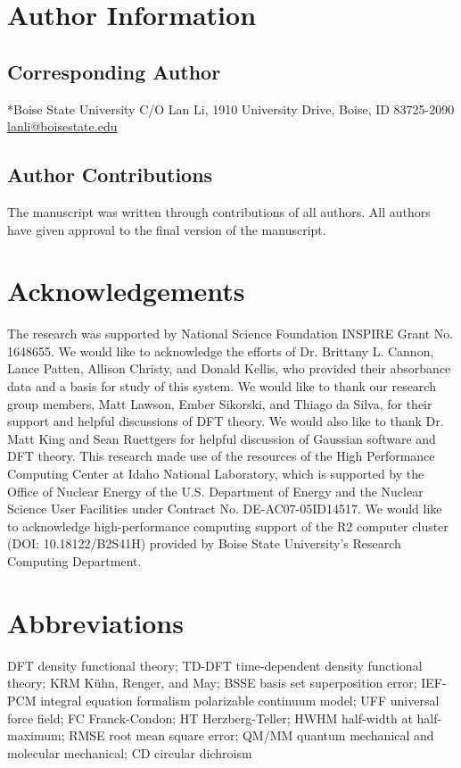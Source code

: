 \section{Author Information}
\subsection{Corresponding Author}
*Boise State University C/O Lan Li, 1910 University Drive, Boise, ID 83725-2090
\href{mailto:lanli@boisestate.edu}{lanli@boisestate.edu}

\subsection{Author Contributions}
The manuscript was written through contributions of all authors. All authors have given approval to the final version of the manuscript. 

\section{Acknowledgements}

The research was supported by National Science Foundation INSPIRE Grant No. 1648655. We would like to acknowledge the efforts of Dr. Brittany L. Cannon, Lance Patten, Allison Christy, and Donald Kellis, who provided their absorbance data and a basis for study of this system. We would like to thank our research group members, Matt Lawson, Ember Sikorski, and Thiago da Silva, for their support and helpful discussions of DFT theory. We would also like to thank Dr. Matt King and Sean Ruettgers for helpful discussion of Gaussian software and DFT theory. This research made use of the resources of the High Performance Computing Center at Idaho National Laboratory, which is supported by the Office of Nuclear Energy of the U.S. Department of Energy and the Nuclear Science User Facilities under Contract No. DE-AC07-05ID14517.  We would like to acknowledge high-performance computing support of the R2 computer cluster (DOI: 10.18122/B2S41H) provided by Boise State University’s Research Computing Department.

\section{Abbreviations}
DFT density functional theory; TD-DFT time-dependent density functional theory; KRM Kühn, Renger, and May; BSSE basis set superposition error; IEF-PCM integral equation formalism polarizable continuum model; UFF universal force field; FC Franck-Condon; HT Herzberg-Teller; HWHM half-width at half-maximum; RMSE root mean square error; QM/MM quantum mechanical and molecular mechanical; CD circular dichroism
